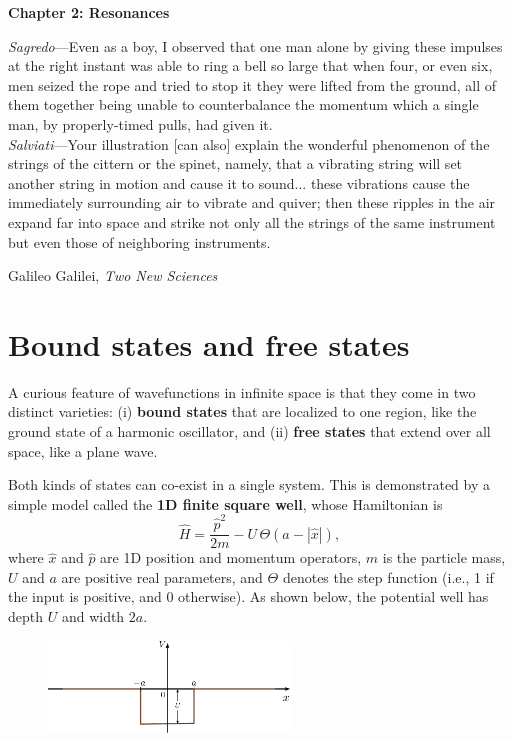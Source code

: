 \documentclass[prx,12pt]{revtex4-2}
\begin{document}
\setcounter{page}{19}

\setlength{\epigraphwidth}{0.7\textwidth}

\begin{center}
{\Large \textbf{Chapter 2: Resonances}}
\end{center}

\epigraph{
\textit{Sagredo}---Even as a boy, I observed that one man alone by giving these impulses at the right instant was able to ring a bell so large that when four, or even six, men seized the rope and tried to stop it they were lifted from the ground, all of them together being unable to counterbalance the momentum which a single man, by properly-timed pulls, had given it. \\ \vskip0.1in
\textit{Salviati}---Your illustration [can also] explain the wonderful phenomenon of the strings of the cittern or the spinet, namely, that a vibrating string will set another string in motion and cause it to sound... these vibrations cause the immediately surrounding air to vibrate and quiver; then these ripples in the air expand far into space and strike not only all the strings of the same instrument but even those of neighboring instruments.}{Galileo Galilei, \textit{Two New Sciences}}

\section{Bound states and free states}

A curious feature of wavefunctions in infinite space is that they come
in two distinct varieties: (i) \textbf{bound states} that are
localized to one region, like the ground state of a harmonic
oscillator, and (ii) \textbf{free states} that extend over all space,
like a plane wave.

Both kinds of states can co-exist in a single system.  This is
demonstrated by a simple model called the \textbf{1D finite square
  well}, whose Hamiltonian is
\begin{equation}
  \hat{H} = \frac{\hat{p}^2}{2m} - U \,\Theta(a -|\hat{x}|),
\end{equation}
where $\hat{x}$ and $\hat{p}$ are 1D position and momentum operators,
$m$ is the particle mass, $U$ and $a$ are positive real parameters,
and $\Theta$ denotes the step function (i.e., 1 if the input is
positive, and 0 otherwise).  As shown below, the potential well has
depth $U$ and width $2a$.

\begin{figure}[h]
  \centering\includegraphics[width=0.57\textwidth]{squarewell}
\end{figure}
\end{document}
